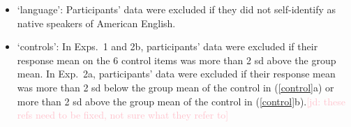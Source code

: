 \documentclass[11pt,fleqn]{article}
\newcommand{\jd}[1]{\textcolor{Pink}{[jd: #1]}}
\newcommand{\jt}[1]{\textbf{\color{blue}JT: #1}}
\newcommand{\6}{\mbox{$[\hspace*{-.6mm}[$}}
\newcommand{\9}{\mbox{$]\hspace*{-.6mm}]$}}
\begin{document}
\begin{itemize}[topsep = -1ex,itemsep=-2pt]


\item `language': Participants' data were excluded if they did not self-identify as native speakers of American English.

\item `controls': In Exps.~1 and 2b, participants' data were excluded if their response mean on the 6 control items was more than 2 sd above the group mean. In Exp.~2a, participants' data were excluded if their response mean was more than 2 sd below the group mean of the control in (\ref{control}a) or more than 2 sd above the group mean of the control in (\ref{control}b).\jd{these refs need to be fixed, not sure what they refer to}


\end{itemize}


\end{document}
